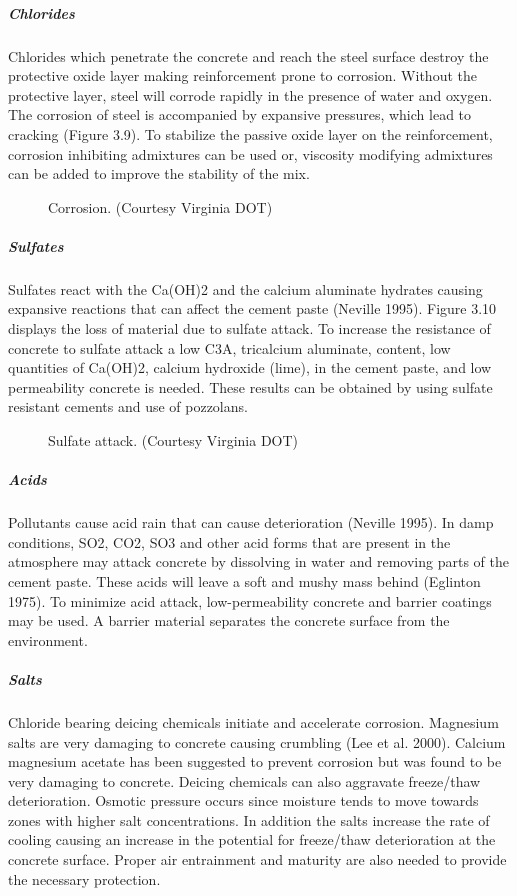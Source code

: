 \subparagraph{Chlorides}
Chlorides which penetrate the concrete and reach the steel surface destroy the protective oxide layer making
reinforcement prone to corrosion. Without the protective layer, steel will corrode rapidly in the presence of water
and oxygen. The corrosion of steel is accompanied by expansive pressures, which lead to cracking (Figure 3.9). To
stabilize the passive oxide layer on the reinforcement, corrosion inhibiting admixtures can be used or, viscosity
modifying admixtures can be added to improve the stability of the mix.

\begin{figure}
  \caption{Corrosion. (Courtesy Virginia DOT)}\label{fig:chlorides-corrosion}
\end{figure}

\subparagraph{Sulfates}
Sulfates react with the Ca(OH)2 and the calcium aluminate hydrates causing expansive reactions that can affect
the cement paste (Neville 1995). Figure 3.10 displays the loss of material due to sulfate attack. To increase the
resistance of concrete to sulfate attack a low C3A, tricalcium aluminate, content, low quantities of Ca(OH)2, calcium
hydroxide (lime), in the cement paste, and low permeability concrete is needed. These results can be obtained by
using sulfate resistant cements and use of pozzolans.

\begin{figure}
  \caption{Sulfate attack. (Courtesy Virginia DOT)}\label{fig:salfate}
\end{figure}


\subparagraph{Acids}
Pollutants cause acid rain that can cause deterioration (Neville 1995). In damp conditions, SO2, CO2, SO3 and
other acid forms that are present in the atmosphere may attack concrete by dissolving in water and removing parts of
the cement paste. These acids will leave a soft and mushy mass behind (Eglinton 1975). To minimize acid attack,
low-permeability concrete and barrier coatings may be used. A barrier material separates the concrete surface from
the environment.


\subparagraph{Salts}
Chloride bearing deicing chemicals initiate and accelerate corrosion. Magnesium salts are very damaging to
concrete causing crumbling (Lee et al. 2000). Calcium magnesium acetate has been suggested to prevent corrosion
but was found to be very damaging to concrete. Deicing chemicals can also aggravate freeze/thaw deterioration.
Osmotic pressure occurs since moisture tends to move towards zones with higher salt concentrations. In addition the
salts increase the rate of cooling causing an increase in the potential for freeze/thaw deterioration at the concrete
surface. Proper air entrainment and maturity are also needed to provide the necessary protection.


